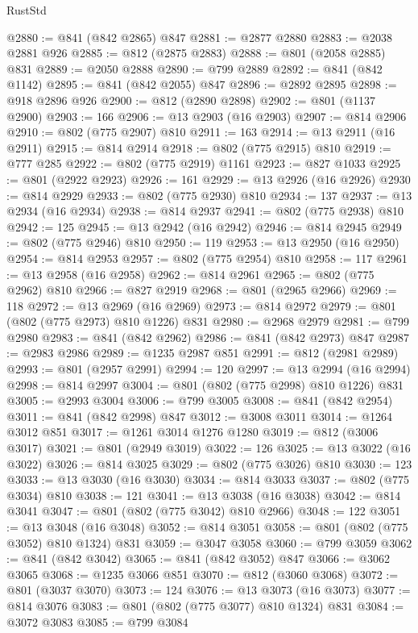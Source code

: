 \begin{lexlean}{RustStd}
\begin{coremodule}
@2880 := @841 (@842 @2865) @847
@2881 := @2877 @2880
@2883 := @2038 @2881 @926
@2885 := @812 (@2875 @2883)
@2888 := @801 (@2058 @2885) @831
@2889 := @2050 @2888
@2890 := @799 @2889
@2892 := @841 (@842 @1142)
@2895 := @841 (@842 @2055) @847
@2896 := @2892 @2895
@2898 := @918 @2896 @926
@2900 := @812 (@2890 @2898)
@2902 := @801 (@1137 @2900)
@2903 := 166
@2906 := @13 @2903 (@16 @2903)
@2907 := @814 @2906
@2910 := @802 (@775 @2907) @810
@2911 := 163
@2914 := @13 @2911 (@16 @2911)
@2915 := @814 @2914
@2918 := @802 (@775 @2915) @810
@2919 := @777 @285
@2922 := @802 (@775 @2919) @1161
@2923 := @827 @1033
@2925 := @801 (@2922 @2923)
@2926 := 161
@2929 := @13 @2926 (@16 @2926)
@2930 := @814 @2929
@2933 := @802 (@775 @2930) @810
@2934 := 137
@2937 := @13 @2934 (@16 @2934)
@2938 := @814 @2937
@2941 := @802 (@775 @2938) @810
@2942 := 125
@2945 := @13 @2942 (@16 @2942)
@2946 := @814 @2945
@2949 := @802 (@775 @2946) @810
@2950 := 119
@2953 := @13 @2950 (@16 @2950)
@2954 := @814 @2953
@2957 := @802 (@775 @2954) @810
@2958 := 117
@2961 := @13 @2958 (@16 @2958)
@2962 := @814 @2961
@2965 := @802 (@775 @2962) @810
@2966 := @827 @2919
@2968 := @801 (@2965 @2966)
@2969 := 118
@2972 := @13 @2969 (@16 @2969)
@2973 := @814 @2972
@2979 := @801 (@802 (@775 @2973) @810 @1226) @831
@2980 := @2968 @2979
@2981 := @799 @2980
@2983 := @841 (@842 @2962)
@2986 := @841 (@842 @2973) @847
@2987 := @2983 @2986
@2989 := @1235 @2987 @851
@2991 := @812 (@2981 @2989)
@2993 := @801 (@2957 @2991)
@2994 := 120
@2997 := @13 @2994 (@16 @2994)
@2998 := @814 @2997
@3004 := @801 (@802 (@775 @2998) @810 @1226) @831
@3005 := @2993 @3004
@3006 := @799 @3005
@3008 := @841 (@842 @2954)
@3011 := @841 (@842 @2998) @847
@3012 := @3008 @3011
@3014 := @1264 @3012 @851
@3017 := @1261 @3014 @1276 @1280
@3019 := @812 (@3006 @3017)
@3021 := @801 (@2949 @3019)
@3022 := 126
@3025 := @13 @3022 (@16 @3022)
@3026 := @814 @3025
@3029 := @802 (@775 @3026) @810
@3030 := 123
@3033 := @13 @3030 (@16 @3030)
@3034 := @814 @3033
@3037 := @802 (@775 @3034) @810
@3038 := 121
@3041 := @13 @3038 (@16 @3038)
@3042 := @814 @3041
@3047 := @801 (@802 (@775 @3042) @810 @2966)
@3048 := 122
@3051 := @13 @3048 (@16 @3048)
@3052 := @814 @3051
@3058 := @801 (@802 (@775 @3052) @810 @1324) @831
@3059 := @3047 @3058
@3060 := @799 @3059
@3062 := @841 (@842 @3042)
@3065 := @841 (@842 @3052) @847
@3066 := @3062 @3065
@3068 := @1235 @3066 @851
@3070 := @812 (@3060 @3068)
@3072 := @801 (@3037 @3070)
@3073 := 124
@3076 := @13 @3073 (@16 @3073)
@3077 := @814 @3076
@3083 := @801 (@802 (@775 @3077) @810 @1324) @831
@3084 := @3072 @3083
@3085 := @799 @3084

\end{coremodule}
\end{lexlean}

